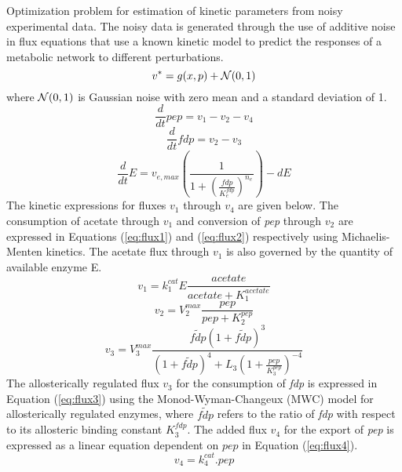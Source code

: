 \documentclass[10pt]{report}
\begin{document}
	Optimization problem for estimation of kinetic parameters from noisy experimental data. The noisy data is generated through the use of additive noise in flux equations that use a known kinetic model to predict the responses of a metabolic network to different perturbations.\\
	\begin{equation}
	v^* = g(x,p) + {\cal{N}}(0,1)
	\end{equation}
	where ${\cal{N}}(0,1)$ is Gaussian noise with zero mean and a standard deviation of 1.
	\begin{equation}\label{eq:ode1}
	\frac{d}{dt}pep=v_1-v_2-v_4
	\end{equation}
	\begin{equation}\label{eq:ode2}
	\frac{d}{dt}fdp=v_2-v_3
	\end{equation}
	\begin{equation}\label{eq:ode3}
	\frac{d}{dt}E=v_{e,max}\left(\frac{1}{1+\left(\frac{fdp}{K_{e}^{fdp}}\right)^{n_e}}\right) - d E
	\end{equation}
	The kinetic expressions for fluxes $v_1$ through $v_4$ are given below. The consumption of acetate through $v_1$ and conversion of \textit{pep} through $v_2$ are expressed in Equations (\ref{eq:flux1}) and (\ref{eq:flux2}) respectively using Michaelis-Menten kinetics. The acetate flux through $v_1$ is also governed by the quantity of available enzyme E. 
	\begin{equation}\label{eq:flux1}
	v_1 = k_{1}^{cat}E\frac{acetate}{acetate+K_{1}^{acetate}}
	\end{equation}	
	\begin{equation}\label{eq:flux2}
	v_2 = V_{2}^{max}\frac{pep}{pep+K_{2}^{pep}}
	\end{equation}
	\begin{equation}\label{eq:flux3}
	v_3 = V_{3}^{max}\frac{\tilde{fdp}\left(1+\tilde{fdp}\right)^3}{\left(1+\tilde{fdp}\right)^4+L_3\left(1+\frac{pep}{K_{3}^{pep}}\right)^{-4}}
	\end{equation}
	The allosterically regulated flux $v_3$ for the consumption of \textit{fdp} is expressed in Equation (\ref{eq:flux3}) using the Monod-Wyman-Changeux (MWC) model for allosterically regulated enzymes, where $\tilde{fdp}$ refers to the ratio of \textit{fdp} with respect to its allosteric binding constant $K_{3}^{fdp}$. The added flux $v_4$ for the export of \textit{pep} is expressed as a linear equation dependent on $pep$ in Equation (\ref{eq:flux4}).
	\begin{equation}\label{eq:flux4}
	v_4 = k_{4}^{cat}.pep
	\end{equation}
	
\end{document}
